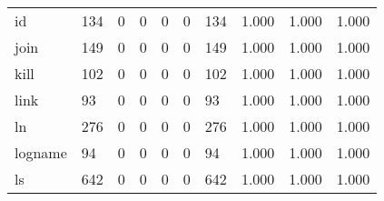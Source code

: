 \begin{longtable}{lp{2.0cm}p{2.0cm}p{2.0cm}p{2.0cm}p{2.0cm}p{2.0cm}p{2.0cm}p{2.0cm}p{2.0cm}}
id        &                    134 &                                  0 &                                 0 &                                0 &                                 0 &                             134 &                                1.000 &                                  1.000 &                                1.000 \\
join      &                    149 &                                  0 &                                 0 &                                0 &                                 0 &                             149 &                                1.000 &                                  1.000 &                                1.000 \\
kill      &                    102 &                                  0 &                                 0 &                                0 &                                 0 &                             102 &                                1.000 &                                  1.000 &                                1.000 \\
link      &                     93 &                                  0 &                                 0 &                                0 &                                 0 &                              93 &                                1.000 &                                  1.000 &                                1.000 \\
ln        &                    276 &                                  0 &                                 0 &                                0 &                                 0 &                             276 &                                1.000 &                                  1.000 &                                1.000 \\
logname   &                     94 &                                  0 &                                 0 &                                0 &                                 0 &                              94 &                                1.000 &                                  1.000 &                                1.000 \\
ls        &                    642 &                                  0 &                                 0 &                                0 &                                 0 &                             642 &                                1.000 &                                  1.000 &                                1.000 \\

\end{longtable}
